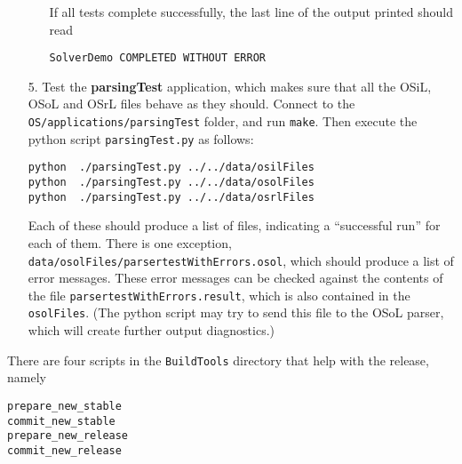 \begin{itemize}
\begin{itemize}
If all tests complete successfully, the last line of the output printed should read
\begin{verbatim}
SolverDemo COMPLETED WITHOUT ERROR
\end{verbatim}

\end{itemize}


\iffalse
\item[b.] Test the {\bf OSFileUpload} application.    Edit  {\bf OSFileUpload.cpp}. First comment out line 79 and then modify line 
\begin{verbatim}
osagent = new OSSolverAgent("http://******/os/servlet/OSFileUpload");
\end{verbatim}
to
{\small
\begin{verbatim}
osagent = new OSSolverAgent("http://gsbkip.chicagogsb.edu/os/servlet/OSFileUpload");
\end{verbatim}
}
Rebuild and run. This application takes one command line argument which is the file to be uploaded. 
\fi

\item[5.] Test the {\bf parsingTest} application, which makes sure that all the OSiL, OSoL and OSrL files behave as they should. Connect to the {\tt OS/applications/parsingTest} folder, and run {\tt make}.  Then execute the python script {\tt parsingTest.py} as follows:  

\begin{verbatim}
python  ./parsingTest.py ../../data/osilFiles
python  ./parsingTest.py ../../data/osolFiles
python  ./parsingTest.py ../../data/osrlFiles
\end{verbatim}

Each of these should produce a list of files, indicating a ``successful run'' for each of them. There is one exception, {\tt data/osolFiles/parsertestWithErrors.osol}, which should produce a list of error messages. These error messages can be checked against the contents of the file 
{\tt parsertestWithErrors.result}, which is also contained in the {\tt osolFiles}. (The python script may try to send this file to the OSoL parser, which will create further output diagnostics.)
\end{itemize}


\label{section:ReleasePrep}

There are four scripts in the {\tt BuildTools} directory that help with the release, namely

\begin{verbatim}
prepare_new_stable
commit_new_stable
prepare_new_release
commit_new_release
\end{verbatim}

